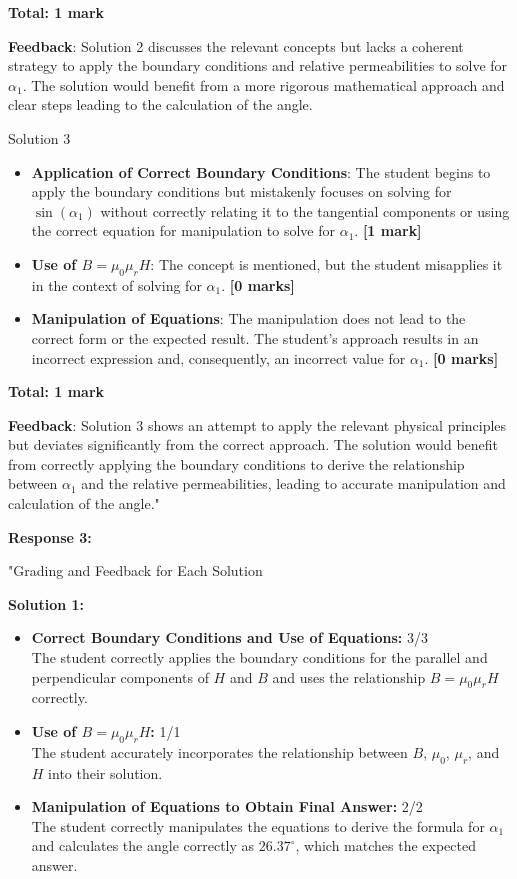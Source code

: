 \documentclass[a4paper,11pt]{article}
\begin{document}
\textbf{Total: 1 mark}

\textbf{Feedback}: Solution 2 discusses the relevant concepts but lacks a coherent strategy to apply the boundary conditions and relative permeabilities to solve for \( \alpha_{1} \). The solution would benefit from a more rigorous mathematical approach and clear steps leading to the calculation of the angle.

Solution 3

\begin{itemize}
    \item \textbf{Application of Correct Boundary Conditions}: The student begins to apply the boundary conditions but mistakenly focuses on solving for \(\sin(\alpha_{1})\) without correctly relating it to the tangential components or using the correct equation for manipulation to solve for \( \alpha_{1} \). \textbf{[1 mark]}
    \item \textbf{Use of \( B = \mu_0 \mu_r H \)}: The concept is mentioned, but the student misapplies it in the context of solving for \( \alpha_{1} \). \textbf{[0 marks]}
    \item \textbf{Manipulation of Equations}: The manipulation does not lead to the correct form or the expected result. The student's approach results in an incorrect expression and, consequently, an incorrect value for \( \alpha_{1} \). \textbf{[0 marks]}
\end{itemize}

\textbf{Total: 1 mark}

\textbf{Feedback}: Solution 3 shows an attempt to apply the relevant physical principles but deviates significantly from the correct approach. The solution would benefit from correctly applying the boundary conditions to derive the relationship between \(\alpha_{1}\) and the relative permeabilities, leading to accurate manipulation and calculation of the angle."

\textbf{Response 3:}

"Grading and Feedback for Each Solution

\textbf{Solution 1:}
\begin{itemize}
    \item \textbf{Correct Boundary Conditions and Use of Equations:} 3/3 \\
    The student correctly applies the boundary conditions for the parallel and perpendicular components of \(H\) and \(B\) and uses the relationship \(B = \mu_0 \mu_r H\) correctly.
    \item \textbf{Use of \(B = \mu_0 \mu_r H\):} 1/1 \\
    The student accurately incorporates the relationship between \(B\), \(\mu_0\), \(\mu_r\), and \(H\) into their solution.
    \item \textbf{Manipulation of Equations to Obtain Final Answer:} 2/2 \\
    The student correctly manipulates the equations to derive the formula for \(\alpha_1\) and calculates the angle correctly as \(26.37^\circ\), which matches the expected answer.
\end{itemize}
\end{document}
